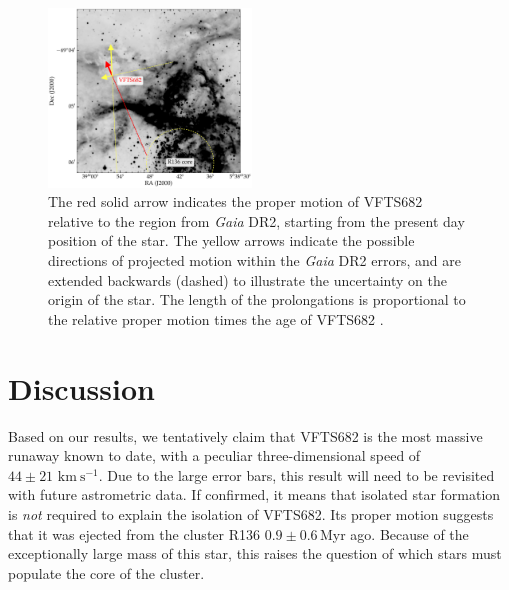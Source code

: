 \documentclass[apjl,twocolumn]{emulateapj}
\newcommand{\todo}[1]{{\large $\blacksquare$~\textbf{\color{red}[#1]}}~$\blacksquare$}
\newcommand{\kms}{{\,\mathrm{km\ s^{-1}}}}
\begin{document}



\begin{figure}%
  \centering
  \includegraphics[width=0.48\textwidth]{./figures/main_plot_good_gaia_only}  
  \caption{The red solid arrow indicates the proper motion of VFTS682
    relative to the region from \emph{Gaia} DR2, starting from the present day position of
    the star. The yellow arrows indicate the possible
    directions of projected motion within the \emph{Gaia} DR2 errors, and are extended
    backwards (dashed) to illustrate the uncertainty on the origin of the
    star. The length of the prolongations is proportional to the relative proper motion
    times the age of VFTS682 \citep[$1.0\pm0.2$\,Myr,][]{schneider:18}.
  }
  
  \label{fig:main}
\end{figure}


\section{Discussion}
\label{sec:discussion}

Based on our results, we tentatively claim that VFTS682 is the most massive
runaway known to date, with a peculiar three-dimensional speed of
$44\pm21\,\kms$. Due to the large error bars, this result will need
to be revisited with future astrometric data. %
If confirmed, it means that isolated star formation is
\emph{not} required to explain the isolation of VFTS682. Its proper motion suggests that it was ejected from the cluster R136
$0.9\pm0.6$\,Myr ago. Because of the exceptionally large mass
of this star, this raises the question of which stars must populate
the core of the cluster.
\end{document}
